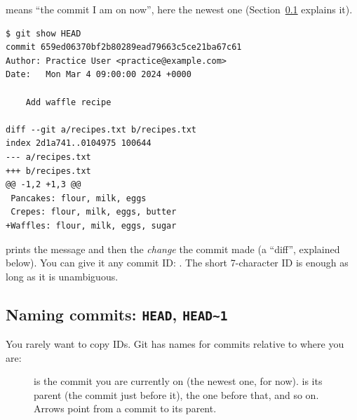  means ``the commit I am on now'', here the newest one (Section~\ref{sec:head} explains it).

\begin{lstlisting}
$ git show HEAD
commit 659ed06370bf2b80289ead79663c5ce21ba67c61
Author: Practice User <practice@example.com>
Date:   Mon Mar 4 09:00:00 2024 +0000

    Add waffle recipe

diff --git a/recipes.txt b/recipes.txt
index 2d1a741..0104975 100644
--- a/recipes.txt
+++ b/recipes.txt
@@ -1,2 +1,3 @@
 Pancakes: flour, milk, eggs
 Crepes: flour, milk, eggs, butter
+Waffles: flour, milk, eggs, sugar
\end{lstlisting}

 prints the message and then the \emph{change} the commit made (a ``diff'', explained below). You can give it any commit ID: . The short 7-character ID is enough as long as it is unambiguous.

\subsection{Naming commits: \texttt{HEAD}, \texttt{HEAD\textasciitilde{}1}}\label{sec:head}

You rarely want to copy IDs. Git has names for commits relative to where you are:

\begin{figure}[H]
\centering
{}
\caption{ is the commit you are currently on (the newest one, for now).  is its parent (the commit just before it),  the one before that, and so on. Arrows point from a commit to its parent.}
\label{fig:head}
\end{figure}

